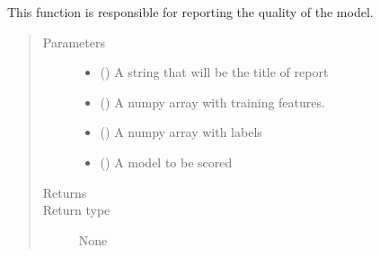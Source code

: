 \documentclass[letterpaper,10pt,english]{sphinxmanual}
\begin{document}
\begin{fulllineitems}
\label{\detokenize{api:readpyne.model.status}}
This function is responsible for reporting the quality of the model.
\begin{quote}\begin{description}
\item[{Parameters}] \leavevmode\begin{itemize}
\item {} 
 () \textendash{} A string that will be the title of report

\item {} 
 () \textendash{} A numpy array with training features.

\item {} 
 () \textendash{} A numpy array with labels

\item {} 
 () \textendash{} A model to be scored

\end{itemize}

\item[{Returns}] \leavevmode


\item[{Return type}] \leavevmode
None

\end{description}\end{quote}

\end{fulllineitems}

\end{document}
